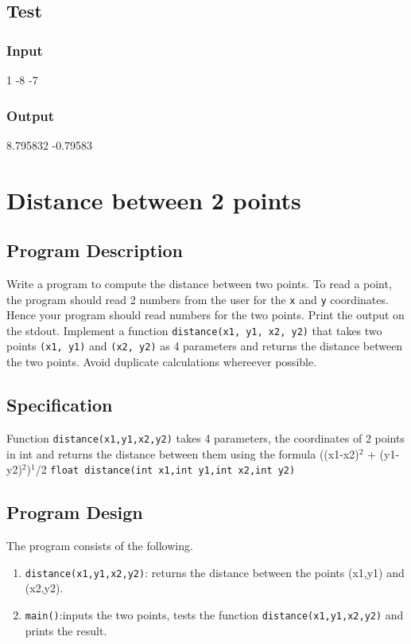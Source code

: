 \documentclass[11pt]{article}
\begin{document}
\subsection*{Test}
\label{sec-5-5}
\subsubsection*{Input}
\label{sec-5-5-1}
1 -8 -7
\subsubsection*{Output}
\label{sec-5-5-2}
8.795832 -0.79583
\section{Distance between 2 points}
\label{sec-6}

\subsection*{Program Description}
\label{sec-6-1}
Write a program to compute the distance between two points. To read a point, the program should read 2 numbers from the user for the \texttt{x} and \texttt{y}
coordinates.  Hence your program should read numbers for the two points. Print the output on the stdout. Implement a function \texttt{distance(x1, y1, x2, y2)}
that takes two points \texttt{(x1, y1)} and \texttt{(x2, y2)} as 4 parameters and returns the distance between the two points. Avoid duplicate calculations
whereever possible.

\subsection*{Specification}
\label{sec-6-2}
Function \texttt{distance(x1,y1,x2,y2)} takes 4 parameters, the coordinates of 2 points in int and returns the distance between them using the formula
((x1-x2)$^{\text{2}}$ + (y1-y2)$^{\text{2}}$)$^{\text{1}}$/2 
\texttt{float distance(int x1,int y1,int x2,int y2)}

\subsection*{Program Design}
\label{sec-6-3}
The program consists of the following.
\begin{enumerate}
\item \texttt{distance(x1,y1,x2,y2)}: returns the distance between the points (x1,y1) and (x2,y2).
\item \texttt{main()}:inputs the two points, tests the function \texttt{distance(x1,y1,x2,y2)} and prints the result.
\end{enumerate}
\end{document}
